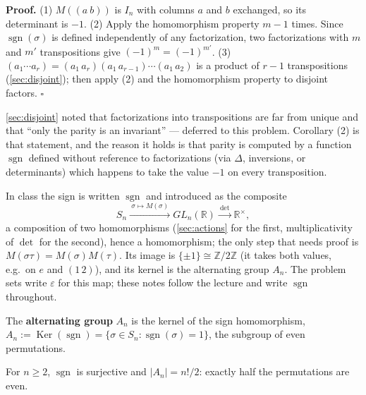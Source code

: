 \documentclass[11pt]{report}
\newcommand{\sgn}{\operatorname{sgn}}
\renewenvironment{proof}[1][Proof]{\noindent\textbf{#1.} }{\hfill$\square$\par\vspace{5pt}}
\begin{document}
\begin{proof}
(1) $M((a\ b))$ is $I_n$ with columns $a$ and $b$ exchanged, so its determinant is $-1$. (2) Apply the homomorphism property $m - 1$ times. Since $\sgn(\sigma)$ is defined independently of any factorization, two factorizations with $m$ and $m'$ transpositions give $(-1)^m = (-1)^{m'}$. (3) $(a_1 \cdots a_r) = (a_1\,a_r)(a_1\,a_{r-1})\cdots(a_1\,a_2)$ is a product of $r - 1$ transpositions (\ref{sec:disjoint}); then apply (2) and the homomorphism property to disjoint factors.
\end{proof}

\begin{rembox}\label{rem:parity-settled}
\ref{sec:disjoint} noted that factorizations into transpositions are far from unique and that ``only the parity is an invariant'' --- deferred to this problem. Corollary (2) is that statement, and the reason it holds is that parity is computed by a function $\sgn$ defined without reference to factorizations (via $\Delta$, inversions, or determinants) which happens to take the value $-1$ on every transposition.
\end{rembox}

\begin{rembox}\label{rem:speyers-presentation-sign-m}
In class the sign is written $\sgn$ and introduced as the composite
\[ S_n \xrightarrow{\ \sigma \mapsto M(\sigma)\ } GL_n(\mathbb{R}) \xrightarrow{\ \det\ } \mathbb{R}^\times, \]
a composition of two homomorphisms (\ref{sec:actions} for the first, multiplicativity of $\det$ for the second), hence a homomorphism; the only step that needs proof is $M(\sigma\tau) = M(\sigma)M(\tau)$. Its image is $\{\pm 1\} \cong \mathbb{Z}/2\mathbb{Z}$ (it takes both values, e.g.\ on $e$ and $(1\,2)$), and its kernel is the alternating group $A_n$. The problem sets write $\varepsilon$ for this map; these notes follow the lecture and write $\sgn$ throughout.
\end{rembox}

\begin{defbox}\label{def:alternating-group-an}
The \textbf{alternating group} $A_n$ is the kernel of the sign homomorphism, $A_n := \operatorname{Ker}(\sgn) = \{\sigma \in S_n : \sgn(\sigma) = 1\}$, the subgroup of even permutations.
\end{defbox}

\begin{propbox}[{Size of $A_n$}]\label{prop:size-an}
For $n \geq 2$, $\sgn$ is surjective and $|A_n| = n!/2$: exactly half the permutations are even.
\end{propbox}
\end{document}
